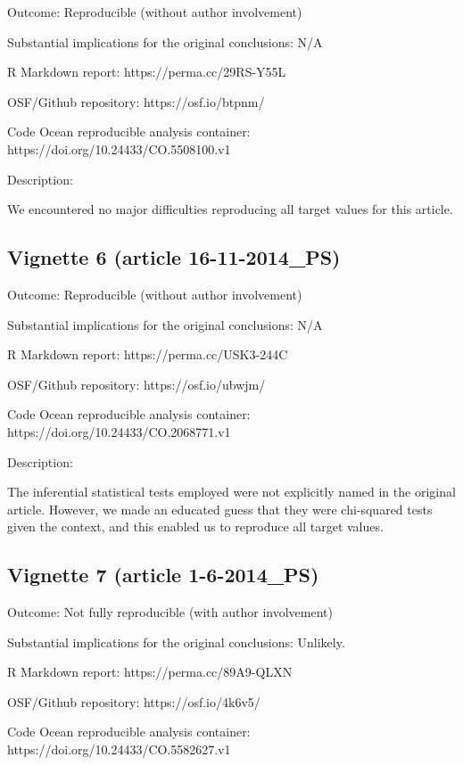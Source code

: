 \begin{appendix}
Outcome: Reproducible (without author involvement)

Substantial implications for the original conclusions: N/A

R Markdown report: https://perma.cc/29RS-Y55L

OSF/Github repository: https://osf.io/btpnm/

Code Ocean reproducible analysis container:
https://doi.org/10.24433/CO.5508100.v1

Description:

We encountered no major difficulties reproducing all target values for
this article.

\hypertarget{vignette-6-article-16-11-2014_ps}{%
\subsection{Vignette 6 (article
16-11-2014\_PS)}\label{vignette-6-article-16-11-2014_ps}}

Outcome: Reproducible (without author involvement)

Substantial implications for the original conclusions: N/A

R Markdown report: https://perma.cc/USK3-244C

OSF/Github repository: https://osf.io/ubwjm/

Code Ocean reproducible analysis container:
https://doi.org/10.24433/CO.2068771.v1

Description:

The inferential statistical tests employed were not explicitly named in
the original article. However, we made an educated guess that they were
chi-squared tests given the context, and this enabled us to reproduce
all target values.

\hypertarget{vignette-7-article-1-6-2014_ps}{%
\subsection{Vignette 7 (article
1-6-2014\_PS)}\label{vignette-7-article-1-6-2014_ps}}

Outcome: Not fully reproducible (with author involvement)

Substantial implications for the original conclusions: Unlikely.

R Markdown report: https://perma.cc/89A9-QLXN

OSF/Github repository: https://osf.io/4k6v5/

Code Ocean reproducible analysis container:
https://doi.org/10.24433/CO.5582627.v1


\end{appendix}
